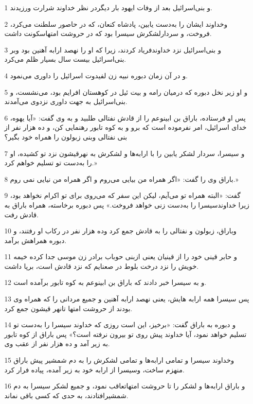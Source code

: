 \par 1 و بنی‌اسرائیل بعد از وفات ایهود بار دیگردر نظر خداوند شرارت ورزیدند.
\par 2 وخداوند ایشان را به‌دست یابین، پادشاه کنعان، که در حاصور سلطنت می‌کرد، فروخت، و سردارلشکرش سیسرا بود که در حروشت امتهاسکونت داشت.
\par 3 و بنی‌اسرائیل نزد خداوندفریاد کردند، زیرا که او را نهصد ارابه آهنین بود وبر بنی‌اسرائیل بیست سال بسیار ظلم می‌کرد.
\par 4 و در آن زمان دبوره نبیه زن لفیدوت اسرائیل را داوری می‌نمود.
\par 5 و او زیر نخل دبوره که درمیان رامه و بیت ئیل در کوهستان افرایم بود، می‌نشست، و بنی‌اسرائیل به جهت داوری نزدوی می‌آمدند.
\par 6 پس او فرستاده، باراق بن ابینوعم را از قادش نفتالی طلبید و به وی گفت: «آیا یهوه، خدای اسرائیل، امر نفرموده است که برو و به کوه تابور رهنمایی کن، و ده هزار نفر از بنی نفتالی وبنی زبولون را همراه خود بگیر؟
\par 7 و سیسرا، سردار لشکر یابین را با ارابه‌ها و لشکرش به نهرقیشون نزد تو کشیده، او را به‌دست تو تسلیم خواهم کرد.»
\par 8 باراق وی را گفت: «اگر همراه من بیایی می‌روم و اگر همراه من نیایی نمی روم.»
\par 9 گفت: «البته همراه تو می‌آیم، لیکن این سفر که می‌روی برای تو اکرام نخواهد بود، زیرا خداوندسیسرا را به‌دست زنی خواهد فروخت.» پس دبوره برخاسته، همراه باراق به قادش رفت.
\par 10 وباراق، زبولون و نفتالی را به قادش جمع کرد وده هزار نفر در رکاب او رفتند، و دبوره همراهش برآمد.
\par 11 و حابر قینی خود را از قینیان یعنی ازبنی حوباب برادر زن موسی جدا کرده خیمه خویش را نزد درخت بلوط در صعنایم که نزد قادش است، برپا داشت.
\par 12 و به سیسرا خبر دادند که باراق بن ابینوعم به کوه تابور برآمده است.
\par 13 پس سیسرا همه ارابه هایش، یعنی نهصد ارابه آهنین و جمیع مردانی را که همراه وی بودند از حروشت امتها تانهر قیشون جمع کرد.
\par 14 و دبوره به باراق گفت: «برخیز، این است روزی که خداوند سیسرا را به‌دست تو تسلیم خواهد نمود، آیا خداوند پیش روی تو بیرون نرفته است؟» پس باراق از کوه تابور به زیر آمد و ده هزار نفر از عقب وی.
\par 15 وخداوند سیسرا و تمامی ارابه‌ها و تمامی لشکرش را به دم شمشیر پیش باراق منهزم ساخت، وسیسرا از ارابه خود به زیر آمده، پیاده فرار کرد.
\par 16 و باراق ارابه‌ها و لشکر را تا حروشت امتهاتعاقب نمود، و جمیع لشکر سیسرا به دم شمشیرافتادند، به حدی که کسی باقی نماند.
